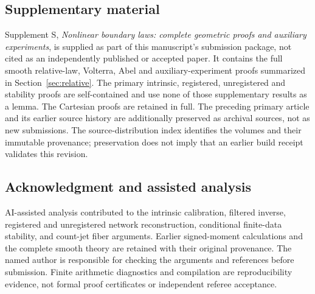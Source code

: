 \documentclass[11pt]{amsart}
\theoremstyle{definition}\newtheorem{definition}[theorem]{Definition}
\theoremstyle{remark}\newtheorem{remark}[theorem]{Remark}
\numberwithin{equation}{section}
\begin{document}
\subsection*{Supplementary material}
Supplement S, \emph{Nonlinear boundary laws: complete geometric proofs
and auxiliary experiments}, is supplied as part of this manuscript's
submission package, not cited as an independently published or accepted
paper. It contains the full smooth relative-law, Volterra, Abel and
auxiliary-experiment proofs summarized in Section~\ref{sec:relative}.
The primary intrinsic, registered, unregistered and stability proofs are
self-contained and use none of those supplementary results as a lemma.
The Cartesian proofs are retained in full. The preceding primary article
and its earlier source history are additionally preserved as archival
sources, not as new submissions. The source-distribution index identifies
the volumes and their immutable provenance; preservation does not imply
that an earlier build receipt validates this revision.
\clearpage
\begin{samepage}
\subsection*{Acknowledgment and assisted analysis}
AI-assisted analysis contributed to the intrinsic calibration, filtered
inverse, registered and unregistered network reconstruction, conditional
finite-data stability, and count-jet fiber arguments. Earlier signed-moment
calculations and the complete smooth theory are retained with their
original provenance. The named author is responsible for checking the
arguments and references before submission. Finite arithmetic diagnostics
and compilation are reproducibility evidence, not formal proof certificates
or independent referee acceptance.
\end{samepage}

\end{document}
